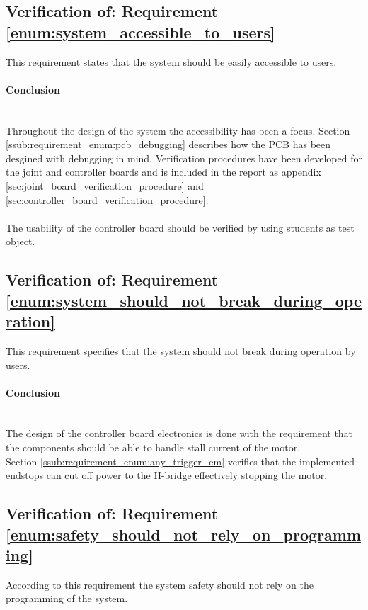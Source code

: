 \subsection{Verification of: Requirement \ref{enum:system_accessible_to_users}} %
\label{sub:verification_of_requirement_enum:system_accessible_to_users}
This requirement states that the system should be easily accessible to users.

\paragraph{Conclusion}~\\
Throughout the design of the system the accessibility has been a focus.
Section \ref{ssub:requirement_enum:pcb_debugging} describes how the PCB has been desgined with debugging in mind.
Verification procedures have been developed for the joint and controller boards and is included in the report as appendix \ref{sec:joint_board_verification_procedure} and \ref{sec:controller_board_verification_procedure}.
\\~\\
The usability of the controller board should be verified by using students as test object. 

\subsection{Verification of: Requirement \ref{enum:system_should_not_break_during_operation}} %
\label{sub:verification_of_requirement_enum:system_should_not_break_during_operation}
This requirement specifies that the system should not break during operation by users.

\paragraph{Conclusion}~\\
The design of the controller board electronics is done with the requirement that the components should be able to handle stall current of the motor.
\\
Section \ref{ssub:requirement_enum:any_trigger_em} verifies that the implemented endstops can cut off power to the H-bridge effectively stopping the motor.

\subsection{Verification of: Requirement \ref{enum:safety_should_not_rely_on_programming}} %
\label{sub:verification_of_requirement_enum:safety_should_not_rely_on_programming}
According to this requirement the system safety should not rely on the programming of the system.

